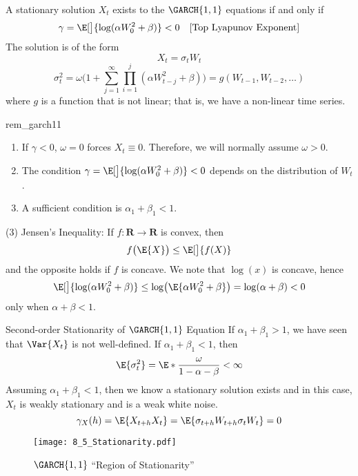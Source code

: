 \begin{Theorem}{}{}
    A stationary solution $ X_t $ exists to the $ \GARCH{1,1} $ equations if and only if
    \[ \gamma=\E[\big]{\log(\alpha W_0^2+\beta)}<0\quad\text{[Top Lyapunov Exponent]} \]
    The solution is of the form
    \[ X_t=\sigma_t W_t \]
    \[ \sigma_t^2=\omega\biggl(1+\sum_{j=1}^{\infty} \prod_{i=1}^j (\alpha W_{t-j}^2+\beta)\biggr)=
        g(W_{t-1},W_{t-2},\ldots) \]
    where $ g $ is a function that is not linear; that is, we have a non-linear time series.
\end{Theorem}
\begin{Remark}{}{rem_garch11}
    \begin{enumerate}[(1)]
        \item If $ \gamma<0 $, $ \omega=0 $ forces $ X_t\equiv 0 $. Therefore, we will
              normally assume $ \omega>0 $.
        \item The condition $ \gamma=\E[\big]{\log(\alpha W_0^2+\beta)}<0 $ depends
              on the distribution of $ W_t $.
        \item A sufficient condition is $ \alpha_1+\beta_1<1 $.
    \end{enumerate}
\end{Remark}
\begin{Proof}{ (3)}{}
    Jensen's Inequality: If $ f:\mathbf{R}\to\mathbf{R} $ is convex, then
    \[ f\bigl(\E{X}\bigr)\le \E[\big]{f(X)} \]
    and the opposite holds if $ f $ is concave. We note that $ \log(x) $
    is concave, hence
    \[ \E[\big]{\log(\alpha W_0^2+\beta)}\le \log\bigl(\E{\alpha W_0^2+\beta}\bigr)=\log(\alpha+\beta)<0 \]
    only when $ \alpha+\beta<1 $.
\end{Proof}
\begin{Remark}{Second-order Stationarity of $ \GARCH{1,1} $ Equation}{}
    If $ \alpha_1+\beta_1>1 $, we have seen that $ \Var{X_t} $ is not well-defined.
    If $ \alpha_1+\beta_1<1 $, then
    \[ \E{\sigma_t^2}=\E*{\frac{\omega}{1-\alpha-\beta}}<\infty \]
    Assuming $ \alpha_1+\beta_1<1 $, then we know a stationary solution exists and
    in this case, $ X_t $ is weakly stationary and is a weak white noise.
    \[ \gamma_X(h)=\E{X_{t+h}X_t}=\E{\sigma_{t+h}W_{t+h}\sigma_t W_t}=0 \]
\end{Remark}
\begin{figure}[!htbp]
    \centering
    \texttt{[image: 8\_5\_Stationarity.pdf]}
    \caption{$ \GARCH{1,1} $ ``Region of Stationarity''}
\end{figure}
